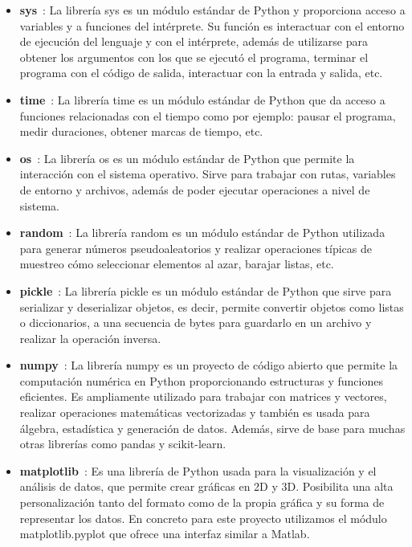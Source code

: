 \begin{itemize}
  \item \textbf{sys}~: La librería sys es un módulo estándar de Python y proporciona acceso a variables y a funciones del 
  intérprete. Su función es interactuar con el entorno de ejecución del lenguaje y con el intérprete, además de utilizarse 
  para obtener los argumentos con los que se ejecutó el programa, terminar el programa con el código de salida, interactuar 
  con la entrada y salida, etc.

  \item \textbf{time}~: La librería time es un módulo estándar de Python que da acceso a funciones relacionadas 
  con el tiempo como por ejemplo: pausar el programa, medir duraciones, obtener marcas de tiempo, etc. 
  
  \item \textbf{os}~: La librería os es un módulo estándar de Python que permite la interacción con el sistema 
  operativo. Sirve para trabajar con rutas, variables de entorno y archivos, además de poder ejecutar operaciones a nivel de sistema.
  
  \item \textbf{random}~: La librería random es un módulo estándar de Python utilizada para generar números 
  pseudoaleatorios y realizar operaciones típicas de muestreo cómo seleccionar elementos al azar, barajar listas, etc.
  
  \item \textbf{pickle}~: La librería pickle es un módulo estándar de Python que sirve para serializar 
  y deserializar objetos, es decir, permite convertir objetos como listas o diccionarios, a una secuencia de bytes para guardarlo 
  en un archivo y realizar la operación inversa.
  
  \item \textbf{numpy}~\cite{NumpyWeb}: La librería numpy es un proyecto de código abierto que permite la computación 
  numérica en Python proporcionando estructuras y funciones eficientes. Es ampliamente utilizado para trabajar con 
  matrices y vectores, realizar operaciones matemáticas vectorizadas y también es usada para álgebra, estadística y generación de 
  datos. Además, sirve de base para muchas otras librerías como pandas y scikit-learn.
  
  \item \textbf{matplotlib}~\cite{MatplotlibWeb}: Es una librería de Python usada para la visualización y el 
  análisis de datos, que permite crear gráficas en 2D y 3D. Posibilita una alta personalización tanto del formato como de la 
  propia gráfica y su forma de representar los datos. 
  En concreto para este proyecto utilizamos el módulo matplotlib.pyplot que ofrece una interfaz similar a Matlab.


\end{itemize}
